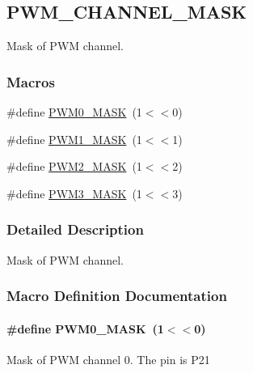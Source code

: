 \hypertarget{group___p_w_m___c_h_a_n_n_e_l___m_a_s_k}{}\subsection{P\+W\+M\+\_\+\+C\+H\+A\+N\+N\+E\+L\+\_\+\+M\+A\+SK}
\label{group___p_w_m___c_h_a_n_n_e_l___m_a_s_k}


Mask of P\+WM channel.  


\subsubsection*{Macros}
\begin{DoxyCompactItemize}
\item 
\#define \hyperlink{group___p_w_m___c_h_a_n_n_e_l___m_a_s_k_gada8162213195c7ec130b2177e049ff4b}{P\+W\+M0\+\_\+\+M\+A\+SK}~(1$<$$<$0)
\item 
\#define \hyperlink{group___p_w_m___c_h_a_n_n_e_l___m_a_s_k_ga3796784991d1e9914b244071cd77cdbf}{P\+W\+M1\+\_\+\+M\+A\+SK}~(1$<$$<$1)
\item 
\#define \hyperlink{group___p_w_m___c_h_a_n_n_e_l___m_a_s_k_ga49753587be6189cab84ed09aa9021951}{P\+W\+M2\+\_\+\+M\+A\+SK}~(1$<$$<$2)
\item 
\#define \hyperlink{group___p_w_m___c_h_a_n_n_e_l___m_a_s_k_ga4cac39bb251a53642d5d6aafddd9fc35}{P\+W\+M3\+\_\+\+M\+A\+SK}~(1$<$$<$3)
\end{DoxyCompactItemize}


\subsubsection{Detailed Description}
Mask of P\+WM channel. 



\subsubsection{Macro Definition Documentation}
\paragraph[{\texorpdfstring{P\+W\+M0\+\_\+\+M\+A\+SK}{PWM0_MASK}}]{\setlength{\rightskip}{0pt plus 5cm}\#define P\+W\+M0\+\_\+\+M\+A\+SK~(1$<$$<$0)}\hypertarget{group___p_w_m___c_h_a_n_n_e_l___m_a_s_k_gada8162213195c7ec130b2177e049ff4b}{}\label{group___p_w_m___c_h_a_n_n_e_l___m_a_s_k_gada8162213195c7ec130b2177e049ff4b}
Mask of P\+WM channel 0. The pin is P21 
